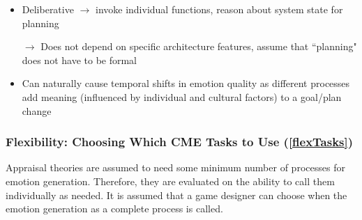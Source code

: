 \begin{itemize}
\begin{itemize}
\begin{itemize}
            \item Deliberative $\rightarrow$ invoke individual functions,
            reason about system state for planning

            \item [$\rightarrow$] Does not depend on specific architecture
            features, assume that ``planning" does not have to be formal

            \item Can naturally cause temporal shifts in emotion quality as
            different processes add meaning (influenced by individual and
            cultural factors) to a goal/plan
            change~\citep[p.~47]{oatley1987towards}
        \end{itemize}
    \end{itemize}
\end{itemize}

\subsubsection{Flexibility: Choosing Which CME Tasks to Use (\ref{flexTasks})}
Appraisal theories are assumed to need some minimum number of processes for
emotion generation. Therefore, they are evaluated on the ability to call them
individually as needed. It is assumed that a game designer can choose when the
emotion generation as a complete process is called.


